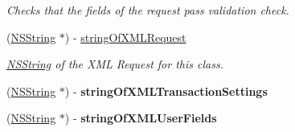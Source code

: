 \begin{DoxyCompactItemize}
\begin{DoxyCompactList}\small\item\em Checks that the fields of the request pass validation check. \item\end{DoxyCompactList}\item 
(\hyperlink{class_n_s_string}{NSString} $\ast$) -\/ \hyperlink{interface_create_transaction_request_a2650296394067bade8916c1fac2a5819}{stringOfXMLRequest}
\begin{DoxyCompactList}\small\item\em \hyperlink{class_n_s_string}{NSString} of the XML Request for this class. \item\end{DoxyCompactList}\item 
\hypertarget{interface_create_transaction_request_affc4790b627bc015ab3bc671b118f2de}{
(\hyperlink{class_n_s_string}{NSString} $\ast$) -\/ {\bfseries stringOfXMLTransactionSettings}}
\label{interface_create_transaction_request_affc4790b627bc015ab3bc671b118f2de}

\item 
\hypertarget{interface_create_transaction_request_ac680c64e04b39aa01fbd87cdcd086457}{
(\hyperlink{class_n_s_string}{NSString} $\ast$) -\/ {\bfseries stringOfXMLUserFields}}
\label{interface_create_transaction_request_ac680c64e04b39aa01fbd87cdcd086457}

\end{DoxyCompactItemize}
